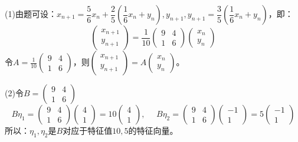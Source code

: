 \documentclass[a4paper]{report}
\begin{document}
\begin{jie}
(1)由题可设：$x_{n+1}=\dfrac{5}{6}x_n+\dfrac{2}{5}\left(\dfrac{1}{6}x_n+y_n\right),y_{n+1},y_{n+1}=\dfrac{3}{5}\left(\dfrac{1}{6}x_n+y_n\right)$，即：
\begin{equation*}
\begin{pmatrix}
x_{n+1}\\ y_{n+1}
\end{pmatrix}=\frac{1}{10}
\begin{pmatrix}
9&4\\1&6
\end{pmatrix}\begin{pmatrix}
x_{n}\\ y_{n}
\end{pmatrix}
\end{equation*}
令$
A=\frac{1}{10}
\begin{pmatrix}
9&4\\1&6
\end{pmatrix}
$，则$
\begin{pmatrix}
x_{n+1}\\ y_{n+1}
\end{pmatrix}=A
\begin{pmatrix}
x_n\\ y_n
\end{pmatrix}
$。

(2)令$B=\begin{pmatrix}
9&4\\1&6
\end{pmatrix}$
\begin{equation*}
B\eta_1=\begin{pmatrix}
9&4\\1&6
\end{pmatrix}\begin{pmatrix}
4\\1
\end{pmatrix}=10\begin{pmatrix}
4\\1
\end{pmatrix},~~~~~~B\eta_2=\begin{pmatrix}
9&4\\1&6
\end{pmatrix}\begin{pmatrix}
-1\\1
\end{pmatrix}=5\begin{pmatrix}
-1\\1
\end{pmatrix}
\end{equation*}
所以：$\eta_1,\eta_2$是$B$对应于特征值$10,5$的特征向量。


\end{jie}
\end{document}
